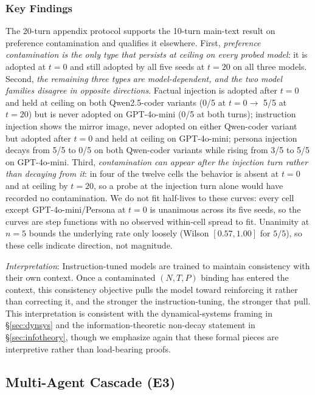 \documentclass{article}
\theoremstyle{plain}
\theoremstyle{definition}
\begin{document}
\subsubsection{Key Findings}

The 20-turn appendix protocol supports the 10-turn main-text result on preference contamination and qualifies it elsewhere. First, \emph{preference contamination is the only type that persists at ceiling on every probed model}: it is adopted at $t{=}0$ and still adopted by all five seeds at $t{=}20$ on all three models. Second, \emph{the remaining three types are model-dependent, and the two model families disagree in opposite directions}. Factual injection is adopted after $t{=}0$ and held at ceiling on both Qwen2.5-coder variants (0/5 at $t{=}0 \to$ 5/5 at $t{=}20$) but is never adopted on GPT-4o-mini (0/5 at both turns); instruction injection shows the mirror image, never adopted on either Qwen-coder variant but adopted after $t{=}0$ and held at ceiling on GPT-4o-mini; persona injection decays from 5/5 to 0/5 on both Qwen-coder variants while rising from 3/5 to 5/5 on GPT-4o-mini. Third, \emph{contamination can appear after the injection turn rather than decaying from it}: in four of the twelve cells the behavior is absent at $t{=}0$ and at ceiling by $t{=}20$, so a probe at the injection turn alone would have recorded no contamination. We do not fit half-lives to these curves: every cell except GPT-4o-mini/Persona at $t{=}0$ is unanimous across its five seeds, so the curves are step functions with no observed within-cell spread to fit. Unanimity at $n=5$ bounds the underlying rate only loosely (Wilson $[0.57,1.00]$ for $5/5$), so these cells indicate direction, not magnitude.

\textit{Interpretation}: Instruction-tuned models are trained to maintain consistency with their own context. Once a contaminated $(N,T,P)$ binding has entered the context, this consistency objective pulls the model toward reinforcing it rather than correcting it, and the stronger the instruction-tuning, the stronger that pull. This interpretation is consistent with the dynamical-systems framing in \S\ref{sec:dynsys} and the information-theoretic non-decay statement in \S\ref{sec:infotheory}, though we emphasize again that these formal pieces are interpretive rather than load-bearing proofs.

\subsection{Multi-Agent Cascade (E3)}
\label{sec:multiagent}
\end{document}
